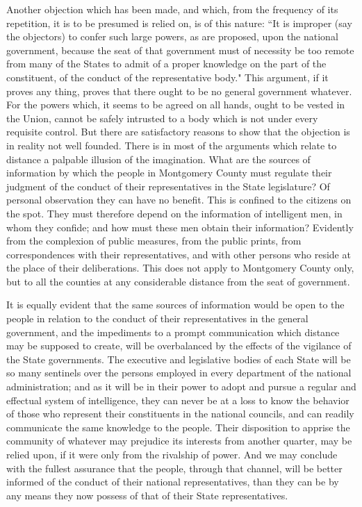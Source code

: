 Another objection which has been made, and which, from the frequency of its repetition, it is to be presumed is relied on, is of this nature: ``It is improper (say the objectors) to confer such large powers, as are proposed, upon the national government, because the seat of that government must of necessity be too remote from many of the States to admit of a proper knowledge on the part of the constituent, of the conduct of the representative body." This argument, if it proves any thing, proves that there ought to be no general government whatever. 
For the powers which, it seems to be agreed on all hands, ought to be vested in the Union, cannot be safely intrusted to a body which is not under every requisite control. 
But there are satisfactory reasons to show that the objection is in reality not well founded. 
There is in most of the arguments which relate to distance a palpable illusion of the imagination. 
What are the sources of information by which the people in Montgomery County must regulate their judgment of the conduct of their representatives in the State legislature? 
Of personal observation they can have no benefit. 
This is confined to the citizens on the spot. 
They must therefore depend on the information of intelligent men, in whom they confide; and how must these men obtain their information? 
Evidently from the complexion of public measures, from the public prints, from correspondences with their representatives, and with other persons who reside at the place of their deliberations. 
This does not apply to Montgomery County only, but to all the counties at any considerable distance from the seat of government.

It is equally evident that the same sources of information would be open to the people in relation to the conduct of their representatives in the general government, and the impediments to a prompt communication which distance may be supposed to create, will be overbalanced by the effects of the vigilance of the State governments. 
The executive and legislative bodies of each State will be so many sentinels over the persons employed in every department of the national administration; and as it will be in their power to adopt and pursue a regular and effectual system of intelligence, they can never be at a loss to know the behavior of those who represent their constituents in the national councils, and can readily communicate the same knowledge to the people. 
Their disposition to apprise the community of whatever may prejudice its interests from another quarter, may be relied upon, if it were only from the rivalship of power. 
And we may conclude with the fullest assurance that the people, through that channel, will be better informed of the conduct of their national representatives, than they can be by any means they now possess of that of their State representatives.


